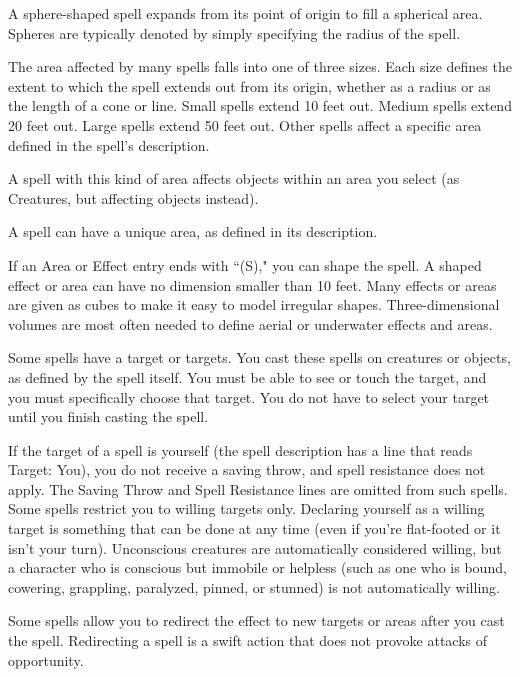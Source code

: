 A sphere-shaped spell expands from its point of origin to fill a spherical area. Spheres are typically denoted by simply specifying the radius of the spell.

 The area affected by many spells falls into one of three sizes. Each size defines the extent to which the spell extends out from its origin, whether as a radius or as the length of a cone or line. Small spells extend 10 feet out. Medium spells extend 20 feet out. Large spells extend 50 feet out. Other spells affect a specific area defined in the spell's description.

 A spell with this kind of area affects objects within an area you select (as Creatures, but affecting objects instead).

 A spell can have a unique area, as defined in its description.

 If an Area or Effect entry ends with ``(S)," you can shape the spell. A shaped effect or area can have no dimension smaller than 10 feet. Many effects or areas are given as cubes to make it easy to model irregular shapes. Three-dimensional volumes are most often needed to define aerial or underwater effects and areas.

 Some spells have a target or targets. You cast these spells on creatures or objects, as defined by the spell itself. You must be able to see or touch the target, and you must specifically choose that target. You do not have to select your target until you finish casting the spell.

If the target of a spell is yourself (the spell description has a line that reads Target: You), you do not receive a saving throw, and spell resistance does not apply. The Saving Throw and Spell Resistance lines are omitted from such spells.
Some spells restrict you to willing targets only. Declaring yourself as a willing target is something that can be done at any time (even if you're flat-footed or it isn't your turn). Unconscious creatures are automatically considered willing, but a character who is conscious but immobile or helpless (such as one who is bound, cowering, grappling, paralyzed, pinned, or stunned) is not automatically willing.

Some spells allow you to redirect the effect to new targets or areas after you cast the spell. Redirecting a spell is a swift action that does not provoke attacks of opportunity.

